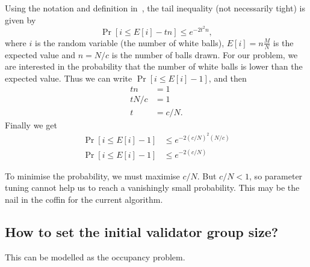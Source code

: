 Using the notation and definition in~\cite{skala2013hypergeometric}, the tail
inequality (not necessarily tight) is given by
\[
\Pr[ i \le E[i] - tn ] \le e^{-2t^2n},
\]
where $i$ is the random variable (the number of white balls), $E[i] = n
\frac{M}{N}$ is the expected value and $n = N/c$ is the number of balls drawn.
For our problem, we are interested in the probability that the number of white
balls is lower than the expected value. Thus we can write $\Pr[i \le E[i] - 1]$,
and then
\begin{align*}
  tn &= 1 \\
  tN/c &= 1 \\
  t &= c/N.
\end{align*}
Finally we get
\begin{align*}
  \Pr[ i \le E[i] - 1] &\le e^{-2 (c/N)^2 (N/c)} \\
  \Pr[ i \le E[i] - 1] &\le e^{-2 (c/N)}
\end{align*}

To minimise the probability, we must maximise $c/N$. But $c/N < 1$, so parameter
tuning cannot help us to reach a vanishingly small probability. This may be the
nail in the coffin for the current algorithm.


\subsection{How to set the initial validator group size?}
This can be modelled as the occupancy problem.

